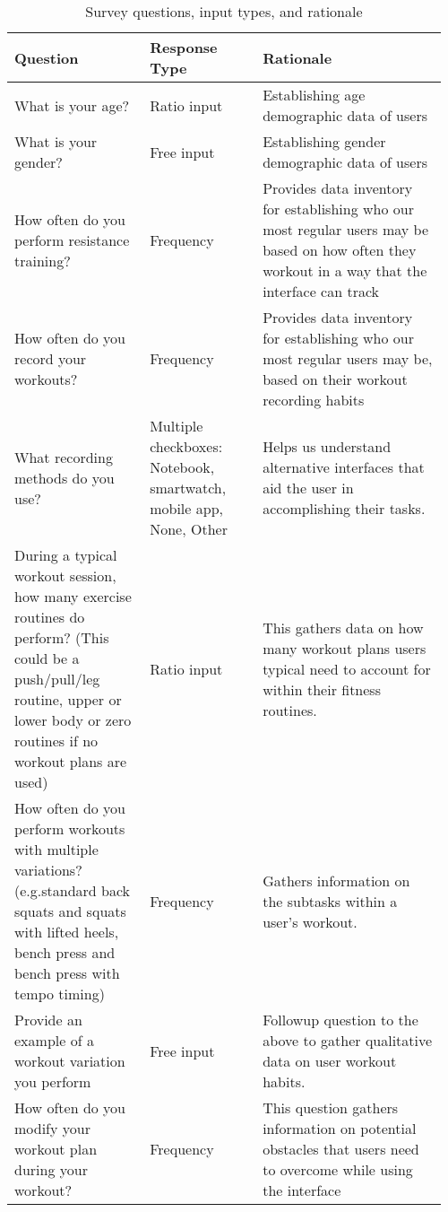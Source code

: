 \documentclass[
	letterpaper, %
]{jdf}
\begin{document}
\begin{table}[H] %
	\caption{Survey questions, input types, and rationale}
	\small %
	\centering %
	\begin{tabular}{L{0.30\linewidth} L{0.25\linewidth} L{0.41\linewidth}}
		\textbf{Question} & \textbf{Response Type} & \textbf{Rationale} \\
		\toprule[0.5pt]
            What is your age? & Ratio input & Establishing age demographic data of users \\
		\midrule
            What is your gender? & Free input & Establishing gender demographic data of users \\
            \midrule
            How often do you perform resistance training? & Frequency & Provides data inventory for establishing who our most regular users may be based on how often they workout in a way that the interface can track \\
            \midrule
            How often do you record your workouts? & Frequency & Provides data inventory for establishing who our most regular users may be, based on their workout recording habits  \\
            \midrule
            What recording methods do you use?  & Multiple checkboxes: Notebook, smartwatch, mobile app, None, Other & Helps us understand alternative interfaces that aid the user in accomplishing their tasks. \\
            \midrule
            During a typical workout session, how many exercise routines do perform? (This could be a push/pull/leg routine, upper or lower body or zero routines if no workout plans are used) & Ratio input & This gathers data on how many workout plans users typical need to account for within their fitness routines. \\
            \midrule
            How often do you perform workouts with multiple variations? (e.g.standard  back squats and squats with lifted heels, bench press and bench press with tempo timing) & Frequency & Gathers information on the subtasks within a user’s workout.  \\
            \midrule
            Provide an example of a workout variation you perform & Free input & Followup question to the above to gather qualitative data on user workout habits. \\
            \midrule
            How often do you modify your workout plan during your workout? & Frequency & This question gathers information on potential obstacles that users need to overcome while using the interface \\

\end{tabular}
\end{table}
\end{document}

